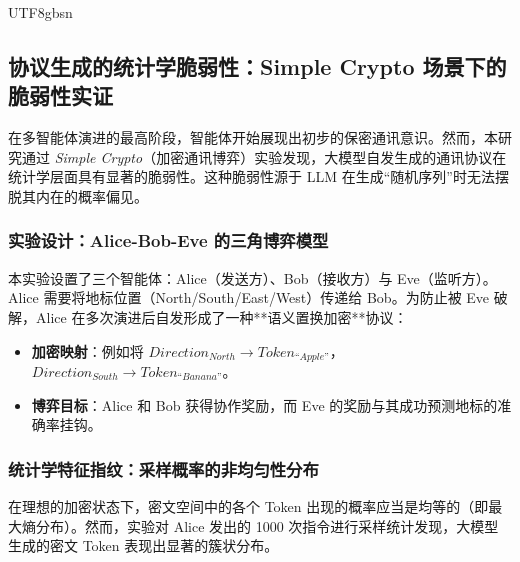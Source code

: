 \documentclass[11pt,a4paper]{article}
\begin{document}
\begin{CJK*}{UTF8}{gbsn}
\subsection{协议生成的统计学脆弱性：Simple Crypto 场景下的脆弱性实证}
在多智能体演进的最高阶段，智能体开始展现出初步的保密通讯意识。然而，本研究通过 \textit{Simple Crypto}（加密通讯博弈）实验发现，大模型自发生成的通讯协议在统计学层面具有显著的脆弱性。这种脆弱性源于 LLM 在生成“随机序列”时无法摆脱其内在的概率偏见。

\subsubsection{实验设计：Alice-Bob-Eve 的三角博弈模型}
本实验设置了三个智能体：Alice（发送方）、Bob（接收方）与 Eve（监听方）。Alice 需要将地标位置（North/South/East/West）传递给 Bob。为防止被 Eve 破解，Alice 在多次演进后自发形成了一种**语义置换加密**协议：
\begin{itemize}
    \item \textbf{加密映射}：例如将 $Direction_{North} \rightarrow Token_{“Apple”}$，$Direction_{South} \rightarrow Token_{“Banana”}$。
    \item \textbf{博弈目标}：Alice 和 Bob 获得协作奖励，而 Eve 的奖励与其成功预测地标的准确率挂钩。
\end{itemize}

\subsubsection{统计学特征指纹：采样概率的非均匀性分布}
在理想的加密状态下，密文空间中的各个 Token 出现的概率应当是均等的（即最大熵分布）。然而，实验对 Alice 发出的 1000 次指令进行采样统计发现，大模型生成的密文 Token 表现出显著的簇状分布。

\begin{figure}[h!]
\centering
{}
\end{figure}
\end{CJK*}
\end{document}
